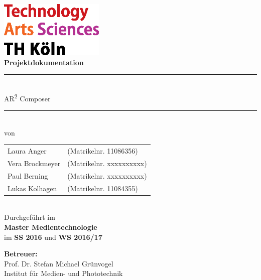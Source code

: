 \documentclass[a4paper, 12pt]{article}
\newcommand{\changefont}[3]{
\fontfamily{#1} \fontseries{#2} \fontshape{#3} \selectfont}
\begin{document}
\linespread{1.2}
\changefont{ppl}{m}{n}
%
%

\begin{center}
			\includegraphics[width=5cm]{Bilder/logo_TH}\\[12ex]
			{\Huge\textbf{Projektdokumentation}}\\[8ex]
			\rule{.8\textwidth}{.2pt}
			{\Large \\[2ex] AR\textsuperscript{2} Composer}\\
			\rule{.8\textwidth}{.2pt}\\[10ex]
			von\\[2ex]
			\begin{tabular}{ll}
			Laura Anger &(Matrikelnr. 11086356)\\ 
			Vera Brockmeyer &(Matrikelnr. xxxxxxxxxx)\\
			Paul Berning &(Matrikelnr. xxxxxxxxxx)\\
			Lukas Kolhagen &(Matrikelnr. 11084355)\\
			\end{tabular}\\[10ex]
			Durchgeführt im\\ \textbf{Master Medientechnologie}\\
			im \textbf{SS 2016} und \textbf{WS 2016/17}\\			
			\end{center}
			\vfill
			\begin{flushleft}
			{\bf Betreuer:}\\
			Prof. Dr. Stefan Michael Grünvogel\\
			Institut für Medien- und Phototechnik
			\end{flushleft}
	\newpage
	\tableofcontents
	\newpage











\newpage


\end{document}
